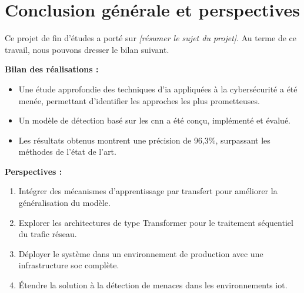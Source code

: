 \chapter*{Conclusion générale et perspectives}

\hspace{1cm}Ce projet de fin d'études a porté sur \textit{[résumer le sujet du projet]}. Au terme de ce travail, nous pouvons dresser le bilan suivant.

\vspace{0.5cm}
\textbf{Bilan des réalisations :}

\begin{itemize}
  \item Une étude approfondie des techniques d'\gls{ia} appliquées à la cybersécurité a été menée, permettant d'identifier les approches les plus prometteuses.
  \item Un modèle de détection basé sur les \gls{cnn} a été conçu, implémenté et évalué.
  \item Les résultats obtenus montrent une précision de 96,3\%, surpassant les méthodes de l'état de l'art.
\end{itemize}

\vspace{0.5cm}
\textbf{Perspectives :}

\begin{enumerate}
  \item Intégrer des mécanismes d'apprentissage par transfert pour améliorer la généralisation du modèle.
  \item Explorer les architectures de type Transformer pour le traitement séquentiel du trafic réseau.
  \item Déployer le système dans un environnement de production avec une infrastructure \gls{soc} complète.
  \item Étendre la solution à la détection de menaces dans les environnements \gls{iot}.
\end{enumerate}
